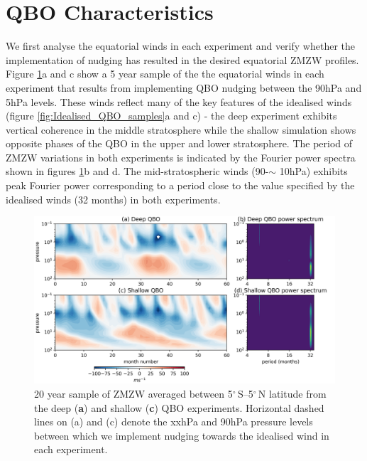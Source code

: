 \section{QBO Characteristics}
We first analyse the equatorial winds in each experiment and verify whether the implementation of nudging has resulted in the desired equatorial ZMZW profiles. Figure \ref{fig:experiment_QBOs}a and c show a 5 year sample of the the equatorial winds in each experiment that results from implementing QBO nudging between the 90hPa and 5hPa levels. These winds reflect many of the key features of the idealised winds (figure \ref{fig:Idealised_QBO_samples}a and c) - the deep experiment exhibits vertical coherence in the middle stratosphere while the shallow simulation shows opposite phases of the QBO in the upper and lower stratosphere. The period of ZMZW variations in both experiments is indicated by the Fourier power spectra shown in figures \ref{fig:experiment_QBOs}b and d. The mid-stratospheric winds (90-$\sim$ 10hPa) exhibits peak Fourier power corresponding to a period close to the value specified by the idealised winds (32 months) in both experiments. 

\begin{figure}[h!]
\begin{center}
\noindent\includegraphics[width = \linewidth]{Figures/Figures-deepQBO/experiment_QBOs.png}
\caption[Equatorial ZMZW time-height profiles from QBO nudging experiments]{20 year sample of ZMZW averaged between 5$^{\circ}$\,S--5$^{\circ}$\,N latitude from the deep (\textbf{a}) and shallow (\textbf{c}) QBO experiments. Horizontal dashed lines on (a) and (c) denote the xxhPa and 90hPa pressure levels between which we implement nudging towards the idealised wind in each experiment.}
\label{fig:experiment_QBOs}
\end{center}
\end{figure}

